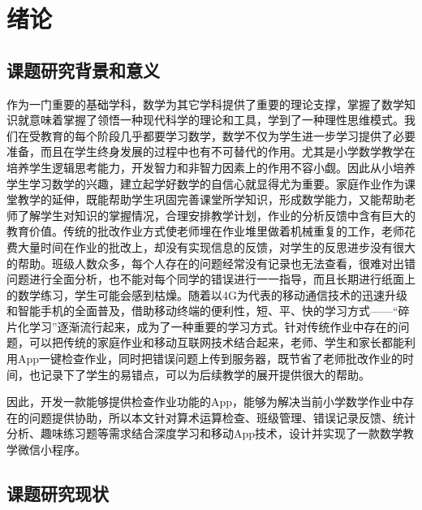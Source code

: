
\chapter{绪论}

\section{课题研究背景和意义}
作为一门重要的基础学科，数学为其它学科提供了重要的理论支撑，掌握了数学知识就意味着掌握了领悟一种现代科学的理论和工具，学到了一种理性思维模式。我们在受教育的每个阶段几乎都要学习数学，数学不仅为学生进一步学习提供了必要准备，而且在学生终身发展的过程中也有不可替代的作用。尤其是小学数学教学在培养学生逻辑思考能力，开发智力和非智力因素上的作用不容小觑。因此从小培养学生学习数学的兴趣，建立起学好数学的自信心就显得尤为重要。家庭作业作为课堂教学的延伸，既能帮助学生巩固完善课堂所学知识，形成数学能力，又能帮助老师了解学生对知识的掌握情况，合理安排教学计划，作业的分析反馈中含有巨大的教育价值。传统的批改作业方式使老师埋在作业堆里做着机械重复的工作，老师花费大量时间在作业的批改上，却没有实现信息的反馈，对学生的反思进步没有很大的帮助。班级人数众多，每个人存在的问题经常没有记录也无法查看，很难对出错问题进行全面分析，也不能对每个同学的错误进行一一指导，而且长期进行纸面上的数学练习，学生可能会感到枯燥。随着以4G为代表的移动通信技术的迅速升级和智能手机的全面普及，借助移动终端的便利性，短、平、快的学习方式——“碎片化学习”逐渐流行起来，成为了一种重要的学习方式。针对传统作业中存在的问题，可以把传统的家庭作业和移动互联网技术结合起来，老师、学生和家长都能利用App一键检查作业，同时把错误问题上传到服务器，既节省了老师批改作业的时间，也记录下了学生的易错点，可以为后续教学的展开提供很大的帮助。
\par
因此，开发一款能够提供检查作业功能的App，能够为解决当前小学数学作业中存在的问题提供协助，所以本文针对算术运算检查、班级管理、错误记录反馈、统计分析、趣味练习题等需求结合深度学习和移动App技术，设计并实现了一款数学教学微信小程序。


\section{课题研究现状}
